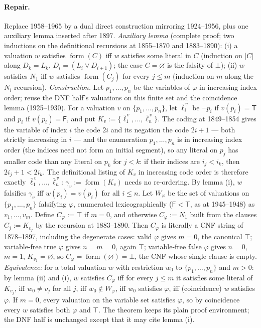 \paragraph{Repair.} Replace 1958--1965 by a dual direct construction
mirroring 1924--1956, plus one auxiliary lemma inserted after 1897.
\emph{Auxiliary lemma} (complete proof; two inductions on the definitional
recursions at 1855--1870 and 1883--1890): (i) a valuation \(w\) satisfies
\(\operatorname{form}(C)\) iff \(w\) satisfies some literal in \(C\)
(induction on \(|C|\) along \(D_k=L_k\), \(D_i=(L_i\lor D_{i+1})\); the case
\(C=\varnothing\) is the falsity of \(\bot\)); (ii) \(w\) satisfies \(N_1\)
iff \(w\) satisfies \(\operatorname{form}(C_j)\) for every \(j\le m\)
(induction on \(m\) along the \(N_i\) recursion).
\emph{Construction.}  Let \(p_1,\ldots,p_n\) be the variables of
\(\varphi\) in increasing index order; reuse the DNF half's valuations on
this finite set and the coincidence lemma (1925--1930).  For a valuation
\(v\) on \(\{p_1,\ldots,p_n\}\), let \(\bar\ell^{\,v}_i\) be \(\neg p_i\) if
\(v(p_i)=\mathsf{T}\) and \(p_i\) if \(v(p_i)=\mathsf{F}\), and put
\(K_v:=\{\bar\ell^{\,v}_1,\ldots,\bar\ell^{\,v}_n\}\).  The coding at
1849--1854 gives the variable of index \(i\) the code \(2i\) and its negation
the code \(2i+1\) --- both strictly increasing in \(i\) --- and the
enumeration \(p_1,\ldots,p_n\) is in increasing index order (the indices need
not form an initial segment), so any literal on \(p_j\) has smaller code than
any literal on \(p_k\) for \(j<k\): if their indices are \(i_j<i_k\), then
\(2i_j+1<2i_k\).  The definitional listing of \(K_v\) in increasing code
order is therefore exactly \(\bar\ell^{\,v}_1,\ldots,\bar\ell^{\,v}_n\):
\(\gamma_v:=\operatorname{form}(K_v)\) needs no re-ordering.  By lemma (i),
\(w\) falsifies \(\gamma_v\) iff \(w(p_i)=v(p_i)\) for all \(i\le n\).  Let
\(W_\varphi\) be the set of valuations on \(\{p_1,\ldots,p_n\}\) falsifying
\(\varphi\), enumerated lexicographically (\(\mathsf{F}<\mathsf{T}\), as at
1945--1948) as \(v_1,\ldots,v_m\).  Define \(C_\varphi:=\top\) if \(m=0\),
and otherwise \(C_\varphi:=N_1\) built from the clauses \(C_j:=K_{v_j}\) by
the recursion at 1883--1890.  Then \(C_\varphi\) is literally a CNF string
of 1878--1897, including the degenerate cases: valid \(\varphi\) gives
\(m=0\), the canonical \(\top\); variable-free true \(\varphi\) gives
\(n=m=0\), again \(\top\); variable-free false \(\varphi\) gives \(n=0\),
\(m=1\), \(K_{v_1}=\varnothing\), so
\(C_\varphi=\operatorname{form}(\varnothing)=\bot\), the CNF whose single
clause is empty.  \emph{Equivalence:} for a total valuation \(w\) with
restriction \(w_0\) to \(\{p_1,\ldots,p_n\}\) and \(m>0\): by lemma (ii)
and (i), \(w\) satisfies \(C_\varphi\) iff for every \(j\le m\) it satisfies
some literal of \(K_{v_j}\), iff \(w_0\ne v_j\) for all \(j\), iff
\(w_0\notin W_\varphi\), iff \(w_0\) satisfies \(\varphi\), iff
(coincidence) \(w\) satisfies \(\varphi\).  If \(m=0\), every valuation on
the variable set satisfies \(\varphi\), so by coincidence every \(w\)
satisfies both \(\varphi\) and \(\top\).  The theorem keeps its plain proof
environment; the DNF half is unchanged except that it may cite lemma (i).

